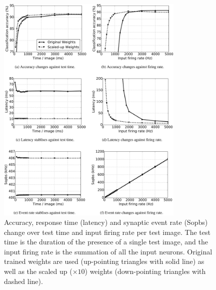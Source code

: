 \documentclass{frontiersENG} %
\begin{document}
\begin{figure}[htb!]
	\centering
	\includegraphics[width=0.8\textwidth]{fig7}
	\caption{Accuracy, response time (latency) and synaptic event rate (Sopbs) change over test time and input firing rate per test image.
	The test time is the duration of the presence of a single test image, and the input firing rate is the summation of all the input neurons.
	Original trained weights are used (up-pointing triangles with solid line) as well as the scaled up ($\times10$) weights (down-pointing triangles with dashed line). }
	\label{fig:assess}
\end{figure}
\end{document}
